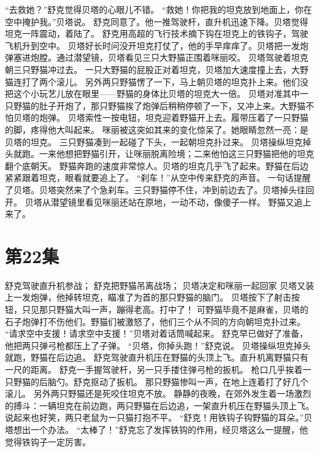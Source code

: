 \documentclass[a4paper,12pt,UTF8,twoside]{ctexbook}
\begin{document}
        “去救她？”舒克觉得贝塔的心眼儿不错。 
        “救她！你把我的坦克放到地面上，你在空中掩护我。”贝塔说。 
        舒克同意了。他一推驾驶杆，直升机迅速下降。贝塔觉得坦克一阵震动，着陆了。 
        舒克用高超的飞行技术摘下钩在坦克上的铁钩子，驾驶飞机升到空中。 
        贝塔好长时问没开坦克打仗了，他的手早痒痒了。贝塔把一发炮弹塞进炮膛。通过潜望镜，贝塔看见三只大野猫正围着咪丽咬。 
        贝塔驾驶着坦克朝三只野猫冲过去。 
        一只大野猫的屁股正对着坦克，贝塔加大速度撞上去，大野猫连打了两个滚儿。 
        另外两只野猫愣了一下，马上朝贝塔的坦克扑上来。他们没把这个小玩艺儿放在眼里——野猫的身体比贝塔的坦克大一倍。 
        贝塔对准其中一只野猫的肚子开炮了，那只野猫挨了炮弹后稍稍停顿了一下，又冲上来。大野猫不怕贝塔的炮弹。 
        贝塔索性一按电钮，坦克迎着野猫开上去。履带压着了一只野猫的脚，疼得他大叫起来。 
        咪丽被这突如其来的变化惊呆了。她眼睛忽然一亮：是贝塔的坦克。 
        三只野猫凑到一起碰了下头，一起朝坦克扑过来。 
        贝塔操纵坦克掉头就跑。一来他想把野猫引开，让咪丽脱离险境；二来他怕这三只野猫把他的坦克翻个底朝天。 
        野猫奔跑的速度非常惊人。贝塔的坦克几乎飞了起来。野猫在后边紧紧跟着坦克，眼看就要追上了。 
        “刹车！”从空中传来舒克的声音。 
        一句话提醒了贝塔。贝塔突然来了个急刹车。三只野猫停不住，冲到前边去了。贝塔掉头往回开。 
        贝塔从潜望镜里看见咪丽还站在原地，一动不动，像傻子一样。 
        野猫又追上来了。   \chapter{第22集} 
        舒克驾驶直升机参战； 
        舒克把野猫吊离战场； 
        贝塔决定和咪丽一起回家   
        贝塔又装上一发炮弹，他掉转坦克，瞄准了为首的那只野猫的脑门。 
        贝塔按下了射击按钮，只见那只野猫大叫一声，蹦得老高。打中了！ 
        可野猫毕竟不是麻雀，贝塔的石子炮弹打不伤他们。野猫们被激怒了，他们三个从不同的方向朝坦克扑过来。 
        “请求空中支援！请求空中支援！”贝塔对着话筒喊起来。 
        舒克早已做好了准备，他把两只弹弓枪都压上了子弹。 
        “贝塔，你掉头跑！”舒克说。 
        贝塔操纵坦克掉头就跑，野猫在后边追。 
        舒克驾驶直升机压在野猫的头顶上飞。直升机离野猫只有一尺的距离。 
        舒克一手握驾驶杆，另一只手搂住弹弓枪的扳机。 
        枪口几乎挨着一只野猫的后脑勺。舒克抠动了扳机。 
        那只野猫惨叫一声，在地上连着打了好几个滚儿。 
        另外两只野猫还是死咬住坦克不放。 
        静静的夜晚，在郊外发生着一场激烈的搏斗：一辆坦克在前边跑，两只野猫在后边追，一架直升机压在野猫头顶上飞。说起来也好笑，两只老鼠为一只猫打抱不平。 
        “舒克！用铁钩子钩野猫的耳朵。”贝塔想出一个办法。 
        “太棒了！”舒克忘了发挥铁钩的作用，经贝塔这么一提醒，他觉得铁钩子一定厉害。 
\end{document}
